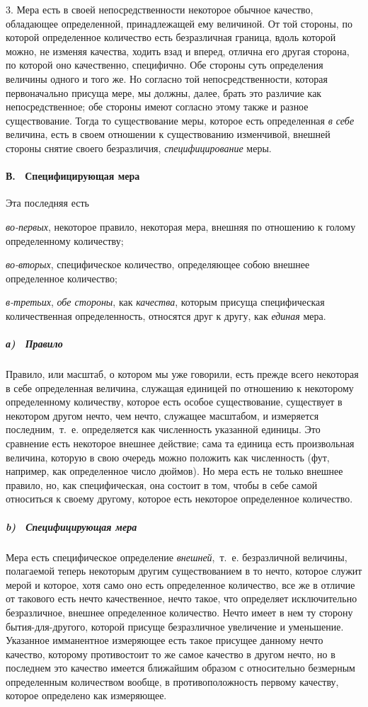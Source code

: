 3. Мера есть в своей непосредственности некоторое обычное качество,
обладающее определенной, принадлежащей ему величиной. От той стороны, по
которой определенное количество есть безразличная граница, вдоль которой
можно, не изменяя качества, ходить взад и вперед, отлична его другая
сторона, по которой оно качественно, специфично. Обе стороны суть
определения величины одного и того же. Но согласно той непосредственности,
которая первоначально присуща мере, мы должны, далее, брать это различие
как непосредственное; обе стороны имеют согласно этому также и разное
существование. Тогда то существование меры, которое есть определенная
{\em в себе} величина, есть в своем отношении к
существованию изменчивой, внешней стороны снятие своего безразличия,
{\em специфицирование} меры.

\paragraph[В. \ Специфицирующая мера]{В. \ Специфицирующая мера}
\hypertarget{Toc478978673}{}Эта последняя есть

{\em во-первых}, некоторое правило, некоторая мера,
внешняя по отношению к голому определенному количеству;

{\em во-вторых}, специфическое количество, определяющее
собою внешнее определенное количество;

{\em в-третьих}, {\em обе стороны},
как {\em качества}, которым присуща специфическая
количественная определенность, относятся друг к другу, как
{\em единая} мера.

\subparagraph[а) \ Правило (61)]{а) \ Правило }
\label{bkm:Ref474666643}
Правило, или масштаб, о котором
мы уже говорили, есть прежде всего некоторая в себе определенная величина,
служащая единицей по отношению к некоторому определенному количеству,
которое есть особое существование, существует в некотором другом нечто, чем
нечто, служащее масштабом, и измеряется последним,~т.~е. определяется как
численность указанной единицы. Это сравнение есть некоторое внешнее
действие; сама та единица есть произвольная величина, которую в свою
очередь можно положить как численность (фут, например, как определенное
число дюймов). Но мера есть не только внешнее правило, но, как
специфическая, она состоит в том, чтобы в себе самой относиться к своему
другому, которое есть некоторое определенное количество.

\subparagraph[b) \ Специфицирующая мера]{b) \ Специфицирующая мера}
Мера есть специфическое определение
{\em внешней},~т.~е. безразличной величины, полагаемой
теперь некоторым другим существованием в то нечто, которое служит мерой и
которое, хотя само оно есть определенное количество, все же в отличие от
такового есть нечто качественное, нечто такое, что определяет исключительно
безразличное, внешнее определенное количество. Нечто имеет в нем ту сторону
бытия-для-другого, которой присуще безразличное увеличение и уменьшение.
Указанное имманентное измеряющее есть такое присущее данному нечто
качество, которому противостоит то же самое качество в другом нечто, но в
последнем это качество имеется ближайшим образом с относительно безмерным
определенным количеством вообще, в противоположность первому качеству,
которое определено как измеряющее.

